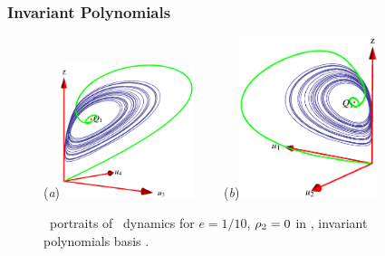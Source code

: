 \subsubsection{Invariant Polynomials}


\begin{figure}[ht]
\begin{center}
  (\textit{a})\includegraphics[width=0.35\textwidth]{../figs/CLEip1}
~~~~(\textit{b})\includegraphics[width=0.36\textwidth]{../figs/CLEip2}
\end{center}
\caption[Orbit space projection of Complex Lorenz flow:
Invariant polynomials basis]{ \Statesp\ portraits of \CLe\
dynamics for $e=1/10$, $\rho_2=0$ in \reducedsp,
invariant polynomials basis .
    }
\label{fig:CLEip}
\end{figure}

